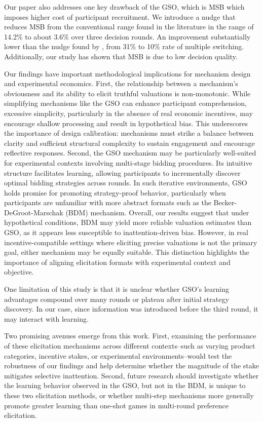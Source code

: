 \documentclass[12pt]{article}
\begin{document}
Our paper also addresses one key drawback of the GSO, which is MSB which imposes higher cost of participant recruitment. We introduce a nudge that reduces MSB from the conventional range found in the literature in the range of 14.2\% to about 3.6\% over three decision rounds. An improvement substantially lower than the nudge found by \citet{yu2021multiple}, from 31\% to 10\% rate of multiple switching. Additionally, our study has shown that MSB is due to low decision quality.


Our findings have important methodological implications for mechanism design and experimental economics. First, the relationship between a mechanism’s obviousness and its ability to elicit truthful valuations is non-monotonic. While simplifying mechanisms like the GSO can enhance participant comprehension, excessive simplicity, particularly in the absence of real economic incentives, may encourage shallow processing and result in hypothetical bias. This underscores the importance of design calibration: mechanisms must strike a balance between clarity and sufficient structural complexity to sustain engagement and encourage reflective responses. Second, the GSO mechanism may be particularly well-suited for experimental contexts involving multi-stage bidding procedures. Its intuitive structure facilitates learning, allowing participants to incrementally discover optimal bidding strategies across rounds. In such iterative environments, GSO holds promise for promoting strategy-proof behavior, particularly when participants are unfamiliar with more abstract formats such as the Becker-DeGroot-Marschak (BDM) mechanism.
Overall, our results suggest that under hypothetical conditions, BDM may yield more reliable valuation estimates than GSO, as it appears less susceptible to inattention-driven bias. However, in real incentive-compatible settings where eliciting precise valuations is not the primary goal, either mechanism may be equally suitable. This distinction highlights the importance of aligning elicitation formats with experimental context and objective.

One limitation of this study  is that it is unclear whether GSO's learning advantages compound over many rounds or plateau after initial strategy discovery. In our case, since information was introduced before the third round, it may interact with learning.

Two promising avenues emerge from this work. First, examining the performance of these elicitation mechanisms across different contexts--such as varying product categories, incentive stakes, or experimental environments--would test the robustness of our findings and help determine whether the magnitude of the stake mitigates selective inattention. Second, future research should investigate whether the learning behavior observed in the GSO, but not in the BDM, is unique to these two elicitation methods, or whether multi-step mechanisms more generally promote greater learning than one-shot games in multi-round preference elicitation.
\end{document}

